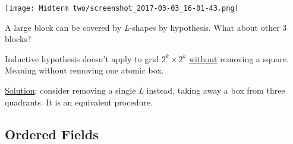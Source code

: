 \documentclass[12pt]{article}
\begin{document}
\begin{itemize}
\begin{center}
\texttt{[image: Midterm two/screenshot\_2017-03-03\_16-01-43.png]}
\end{center} A large block can be
covered by \emph{L}-shapes by hypothesis. What about other 3 blocks?

Inductive hypothesis doesn't apply to grid \(2^k\times2^k\) \uline{without}
removing a square. Meaning without removing one atomic box.

\uline{Solution}: consider removing a single \emph{L} instead, taking away a box from
three quadrants. It is an equivalent procedure.
\end{itemize}

\subsection{Ordered Fields}
\label{sec:orged049c1}
\end{document}
